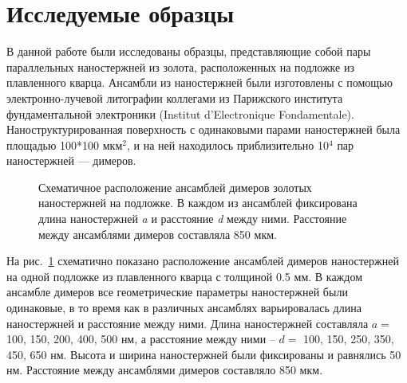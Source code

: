 \section{Исследуемые образцы}

В данной работе были исследованы образцы, представляющие собой пары параллельных наностержней из золота, расположенных на подложке из плавленного кварца. Ансамбли из наностержней были изготовлены с помощью  электронно-лучевой литографии коллегами из Парижского института фундаментальной электроники (Institut d'Electronique Fondamentale). Наноструктурированная поверхность с одинаковыми парами наностержней была площадью 100*100 мкм$ ^2 $, и на ней находилось приблизительно 10$ ^4 $ пар наностержней --- димеров.
\begin{figure}[!h]
\caption{Схематичное расположение ансамблей димеров золотых наностержней на подложке. В каждом из ансамблей фиксирована длина наностержней \textit{a} и расстояние \textit{d} между ними. Расстояние между ансамблями димеров составляла 850 мкм.}
\label{img:sample}
\end{figure}
На рис.~\ref{img:sample} схематично показано расположение ансамблей димеров наностержней на одной подложке из плавленного кварца с толщиной 0.5 мм. В каждом ансамбле димеров все геометрические параметры наностержней были одинаковые, в то время как в различных ансамблях варьировалась длина наностержней и расстояние между ними. Длина наностержней составляла $ a = $ 100, 150, 200, 400, 500 нм, а расстояние между ними -- $ d = $ 100, 150, 250, 350, 450, 650 нм. Высота и ширина наностержней были фиксированы и равнялись 50 нм. Расстояние между ансамблями димеров составляло 850 мкм.

